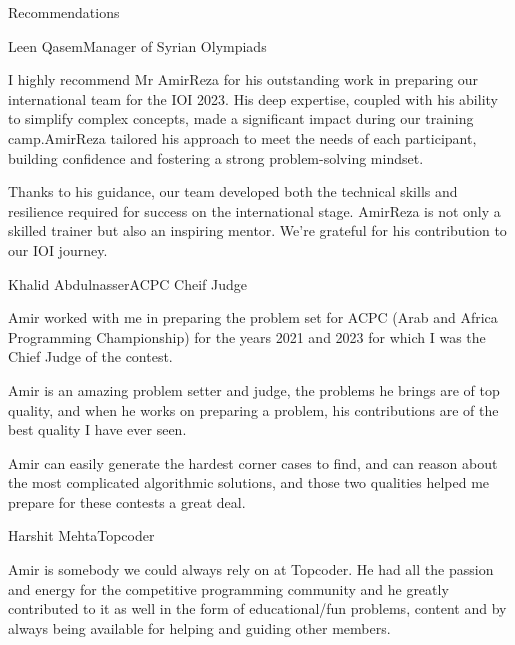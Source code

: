 \begin{section}{Recommendations}
  \begin{subsectionnobullet}{Leen Qasem}{Manager of Syrian Olympiads}{}{}
  \item
  I highly recommend Mr AmirReza for his outstanding work in preparing our international team for the IOI 2023. His deep expertise, coupled with his ability to simplify complex concepts, made a significant impact during our training camp.AmirReza tailored his approach to meet the needs of each participant, building confidence and fostering a strong problem-solving mindset.

Thanks to his guidance, our team developed both the technical skills and resilience required for success on the international stage. AmirReza is not only a skilled trainer but also an inspiring mentor. We’re grateful for his contribution to our IOI journey.

  \end{subsectionnobullet}
  \begin{subsectionnobullet}{Khalid Abdulnasser}{ACPC Cheif Judge}{}{}
  \item Amir worked with me in preparing the problem set for ACPC (Arab and Africa Programming Championship) for the years 2021 and 2023 for which I was the Chief Judge of the contest. 

Amir is an amazing problem setter and judge, the problems he brings are of top quality, and when he works on preparing a problem, his contributions are of the best quality I have ever seen. 

Amir can easily generate the hardest corner cases to find, and can reason about the most complicated algorithmic solutions, and those two qualities helped me prepare for these contests a great deal.

  \end{subsectionnobullet}
  
  \begin{subsectionnobullet}{Harshit Mehta}{Topcoder}{}{}
  \item Amir is somebody we could always rely on at Topcoder. He had all the passion and energy for the competitive programming community and he greatly contributed to it as well in the form of educational/fun problems, content and by always being available for helping and guiding other members. 

  \end{subsectionnobullet}
\end{section}
